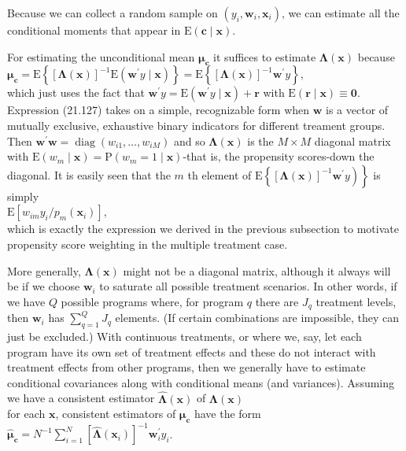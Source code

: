 \documentclass[10pt]{article}
\begin{document}
Because we can collect a random sample on $\left(y_{i}, \mathbf{w}_{i}, \mathbf{x}_{i}\right)$, we can estimate all the conditional moments that appear in $\mathrm{E}(\mathbf{c} \mid \mathbf{x})$.

For estimating the unconditional mean $\boldsymbol{\mu}_{\mathbf{c}}$ it suffices to estimate $\boldsymbol{\Lambda}(\mathbf{x})$ because\\
$\boldsymbol{\mu}_{\mathbf{c}}=\mathrm{E}\left\{[\boldsymbol{\Lambda}(\mathbf{x})]^{-1} \mathrm{E}\left(\mathbf{w}^{\prime} y \mid \mathbf{x}\right)\right\}=\mathrm{E}\left\{[\boldsymbol{\Lambda}(\mathbf{x})]^{-1} \mathbf{w}^{\prime} y\right\}$,\\
which just uses the fact that $\mathbf{w}^{\prime} y=\mathrm{E}\left(\mathbf{w}^{\prime} y \mid \mathbf{x}\right)+\mathbf{r}$ with $\mathrm{E}(\mathbf{r} \mid \mathbf{x}) \equiv \mathbf{0}$.\\
Expression (21.127) takes on a simple, recognizable form when $\mathbf{w}$ is a vector of mutually exclusive, exhaustive binary indicators for different treament groups. Then $\mathbf{w}^{\prime} \mathbf{w}=\operatorname{diag}\left(w_{i 1}, \ldots, w_{i M}\right)$ and so $\boldsymbol{\Lambda}(\mathbf{x})$ is the $M \times M$ diagonal matrix with $\mathrm{E}\left(w_{m} \mid \mathbf{x}\right)= \mathrm{P}\left(w_{m}=1 \mid \mathbf{x}\right)$-that is, the propensity scores-down the diagonal. It is easily seen that the $m$ th element of $\left.\mathrm{E}\left\{[\boldsymbol{\Lambda}(\mathbf{x})]^{-1} \mathbf{w}^{\prime} y\right)\right\}$ is simply\\
$\mathrm{E}\left[w_{i m} y_{i} / p_{m}\left(\mathbf{x}_{i}\right)\right]$,\\
which is exactly the expression we derived in the previous subsection to motivate propensity score weighting in the multiple treatment case.

More generally, $\boldsymbol{\Lambda}(\mathbf{x})$ might not be a diagonal matrix, although it always will be if we choose $\mathbf{w}_{i}$ to saturate all possible treatment scenarios. In other words, if we have $Q$ possible programs where, for program $q$ there are $J_{q}$ treatment levels, then $\mathbf{w}_{i}$ has $\sum_{q=1}^{Q} J_{q}$ elements. (If certain combinations are impossible, they can just be excluded.) With continuous treatments, or where we, say, let each program have its own set of treatment effects and these do not interact with treatment effects from other programs, then we generally have to estimate conditional covariances along with conditional means (and variances). Assuming we have a consistent estimator $\hat{\boldsymbol{\Lambda}}(\mathbf{x})$ of $\boldsymbol{\Lambda}(\mathbf{x})$\\
for each $\mathbf{x}$, consistent estimators of $\boldsymbol{\mu}_{\mathbf{c}}$ have the form\\
$\hat{\boldsymbol{\mu}}_{\mathbf{c}}=N^{-1} \sum_{i=1}^{N}\left[\hat{\boldsymbol{\Lambda}}\left(\mathbf{x}_{i}\right)\right]^{-1} \mathbf{w}_{i}^{\prime} y_{i}$.
\end{document}
